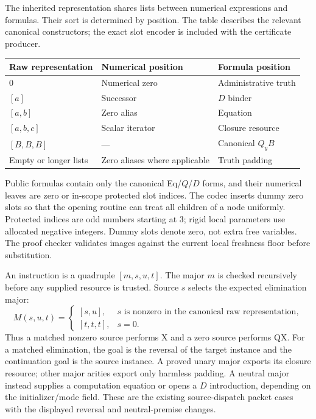 The inherited representation shares lists between numerical expressions
and formulas. Their sort is determined by position. The table describes
the relevant canonical constructors; the exact slot encoder is included
with the certificate producer.
\begin{center}\small
\begin{tabular}{@{}lll@{}}
\toprule
Raw representation & Numerical position & Formula position\\
\midrule
$0$ & Numerical zero & Administrative truth\\
$[a]$ & Successor & $D$ binder\\
$[a,b]$ & Zero alias & Equation\\
$[a,b,c]$ & Scalar iterator & Closure resource\\
$[B,B,B]$ & --- & Canonical $Q_yB$\\
Empty or longer lists & Zero aliases where applicable & Truth padding\\
\bottomrule
\end{tabular}
\end{center}

Public formulas contain only the canonical Eq/$Q$/$D$ forms, and their
numerical leaves are zero or in-scope protected slot indices. The codec
inserts dummy zero slots so that the opening routine can treat all
children of a node uniformly. Protected indices are odd numbers starting
at 3; rigid local parameters use allocated negative integers. Dummy slots
denote zero, not extra free variables. The proof checker validates images
against the current local freshness floor before substitution.

An instruction is a quadruple $[m,s,u,t]$. The major $m$ is checked
recursively before any supplied resource is trusted. Source $s$ selects
the expected elimination major:
\[
 M(s,u,t)=
 \begin{cases}
 [s,u],&s\text{ is nonzero in the canonical raw representation},\\
 [t,t,t],&s=0.
 \end{cases}
\]
Thus a matched nonzero source performs X and a zero source performs QX.
For a matched elimination, the goal is the reversal of the target
instance and the continuation goal is the source instance. A proved
unary major exports its closure resource; other major arities export
only harmless padding. A neutral major instead supplies a computation
equation or opens a $D$ introduction, depending on the initializer/mode
field. These are the existing source-dispatch packet cases with the
displayed reversal and neutral-premise changes.

